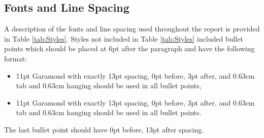 \subsection{Fonts and Line Spacing}
A description of the fonts and line spacing used throughout the report is provided in Table \ref{tab:Styles}. Styles not included in Table \ref{tab:Styles} included bullet points which should be placed at 6pt after the paragraph and have the following format:
\begin{itemize}
    \item {}11pt Garamond with exactly 13pt spacing, 0pt before, 3pt after, and 0.63cm tab and 0.63cm hanging should be used in all bullet points,
    \item 11pt Garamond with exactly 13pt spacing, 0pt before, 3pt after, and 0.63cm tab and 0.63cm hanging should be used in all bullet points.
\end{itemize}
The last bullet point should have 0pt before, 13pt after spacing.

